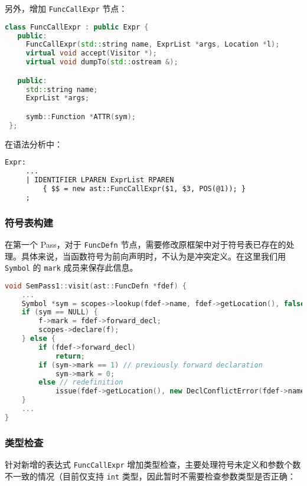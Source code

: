 \documentclass[a4paper]{article}
\begin{document}
另外，增加 \texttt{FuncCallExpr} 节点：

\begin{lstlisting}[language=c++]
class FuncCallExpr : public Expr {
   public:
     FuncCallExpr(std::string name, ExprList *args, Location *l);
     virtual void accept(Visitor *);
     virtual void dumpTo(std::ostream &);

   public:
     std::string name;
     ExprList *args;

     symb::Function *ATTR(sym);
 };
\end{lstlisting}

在语法分析中：

\begin{lstlisting}[language=diff]
Expr:
     ...
     | IDENTIFIER LPAREN ExprList RPAREN
         { $$ = new ast::FuncCallExpr($1, $3, POS(@1)); }
     ;
\end{lstlisting}

\subsubsection{符号表构建}

在第一个 Pass，对于 \texttt{FuncDefn} 节点，需要修改原框架中对于符号表已存在的处理。具体来说，当函数符号为前向声明时，不认为是冲突定义。在这里我们用 \texttt{Symbol} 的 \texttt{mark} 成员来保存此信息。

\begin{lstlisting}[language=c++]
void SemPass1::visit(ast::FuncDefn *fdef) {
    ...
    Symbol *sym = scopes->lookup(fdef->name, fdef->getLocation(), false);
    if (sym == NULL) {
        f->mark = fdef->forward_decl;
        scopes->declare(f);
    } else {
        if (fdef->forward_decl)
            return;
        if (sym->mark == 1) // previously forward declaration
            sym->mark = 0;
        else // redefinition
            issue(fdef->getLocation(), new DeclConflictError(fdef->name, sym));
    }
    ...
}
\end{lstlisting}

\subsubsection{类型检查}

针对新增的表达式 \texttt{FuncCallExpr} 增加类型检查，主要处理符号未定义和参数个数不一致的情况（目前仅支持 \texttt{int} 类型，因此暂时不需要检查参数类型是否正确：
\end{document}
